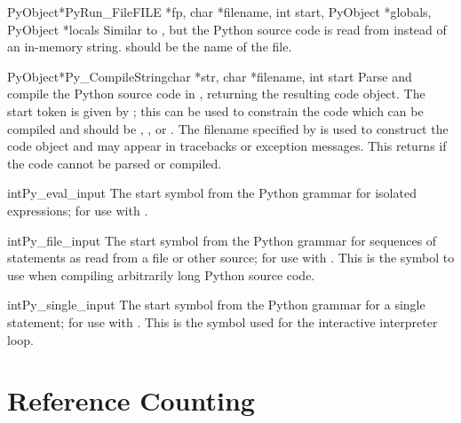 \documentclass{manual}
\begin{document}
\begin{cfuncdesc}{PyObject*}{PyRun_File}{FILE *fp, char *filename,
                                         int start, PyObject *globals,
                                         PyObject *locals}
  Similar to , but the Python source code is 
  read from  instead of an in-memory string.
   should be the name of the file.
\end{cfuncdesc}

\begin{cfuncdesc}{PyObject*}{Py_CompileString}{char *str, char *filename,
                                               int start}
  Parse and compile the Python source code in , returning the 
  resulting code object.  The start token is given by ;
  this can be used to constrain the code which can be compiled and should
  be , , or
  .  The filename specified by
   is used to construct the code object and may appear
  in tracebacks or  exception messages.  This
  returns \NULL{} if the code cannot be parsed or compiled.
\end{cfuncdesc}

\begin{cvardesc}{int}{Py_eval_input}
  The start symbol from the Python grammar for isolated expressions;
  for use with .
\end{cvardesc}

\begin{cvardesc}{int}{Py_file_input}
  The start symbol from the Python grammar for sequences of statements
  as read from a file or other source; for use with
  .  This is
  the symbol to use when compiling arbitrarily long Python source code.
\end{cvardesc}

\begin{cvardesc}{int}{Py_single_input}
  The start symbol from the Python grammar for a single statement; for 
  use with .
  This is the symbol used for the interactive interpreter loop.
\end{cvardesc}


\chapter{Reference Counting \label{countingRefs}}
\end{document}

